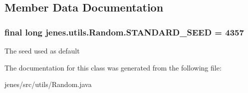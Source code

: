 \subsection{Member Data Documentation}
\hypertarget{classjenes_1_1utils_1_1_random_aee05c4e6476472dc9dc02d2fd94061b5}{
\subsubsection[{S\-T\-A\-N\-D\-A\-R\-D\-\_\-\-S\-E\-E\-D}]{\setlength{\rightskip}{0pt plus 5cm}final long jenes.\-utils.\-Random.\-S\-T\-A\-N\-D\-A\-R\-D\-\_\-\-S\-E\-E\-D = 4357\hspace{0.3cm}{\ttfamily [static]}}}\label{classjenes_1_1utils_1_1_random_aee05c4e6476472dc9dc02d2fd94061b5}
The seed used as default 

The documentation for this class was generated from the following file\-:\begin{DoxyCompactItemize}
\item 
jenes/src/utils/Random.\-java\end{DoxyCompactItemize}
